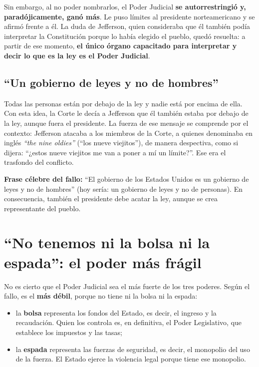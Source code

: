 \documentclass[12pt,oneside,a4paper]{book}
\begin{document}
Sin embargo, al no poder nombrarlos, el Poder Judicial \textbf{se autorrestringió y, paradójicamente, ganó más}. Le puso límites al presidente norteamericano y se afirmó frente a él. La duda de Jefferson, quien consideraba que él también podía interpretar la Constitución porque lo había elegido el pueblo, quedó resuelta: a partir de ese momento, \textbf{el único órgano capacitado para interpretar y decir lo que es la ley es el Poder Judicial}.

\subsection{``Un gobierno de leyes y no de hombres''}

Todas las personas están por debajo de la ley y nadie está por encima de ella. Con esta idea, la Corte le decía a Jefferson que él también estaba por debajo de la ley, aunque fuera el presidente. La fuerza de ese mensaje se comprende por el contexto: Jefferson atacaba a los miembros de la Corte, a quienes denominaba en inglés \textit{``the nine oldies''} (``los nueve viejitos''), de manera despectiva, como si dijera: ``¿estos nueve viejitos me van a poner a mí un límite?''. Ese era el trasfondo del conflicto.

\begin{important}
\textbf{Frase célebre del fallo:} ``El gobierno de los Estados Unidos es un gobierno de leyes y no de hombres'' (hoy sería: un gobierno de leyes y no de personas). En consecuencia, también el presidente debe acatar la ley, aunque se crea representante del pueblo.
\end{important}

\section{``No tenemos ni la bolsa ni la espada'': el poder más frágil}

No es cierto que el Poder Judicial sea el más fuerte de los tres poderes. Según el fallo, es el \textbf{más débil}, porque no tiene ni la bolsa ni la espada:
\begin{itemize}
    \item la \textbf{bolsa} representa los fondos del Estado, es decir, el ingreso y la recaudación. Quien los controla es, en definitiva, el Poder Legislativo, que establece los impuestos y las tasas;
    \item la \textbf{espada} representa las fuerzas de seguridad, es decir, el monopolio del uso de la fuerza. El Estado ejerce la violencia legal porque tiene ese monopolio.
\end{itemize}
\end{document}
